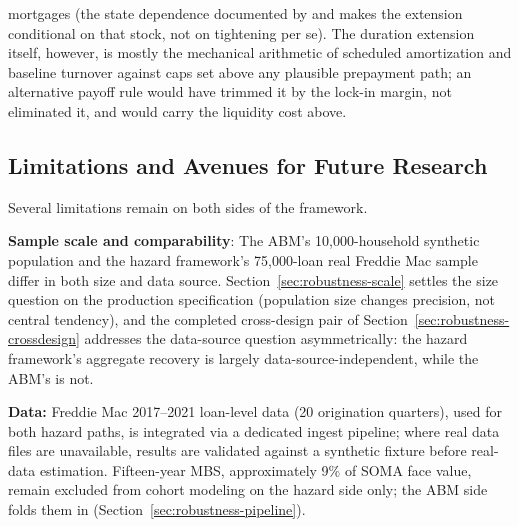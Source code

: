 \documentclass[12pt]{article}
\begin{document}
mortgages (the state dependence documented by \citet{berger2021} and \citet{eichenbaum2022} makes the extension conditional on that stock, not on tightening per se). The duration extension itself, however, is mostly the mechanical arithmetic of scheduled amortization and baseline turnover against caps set above any plausible prepayment path; an alternative payoff rule would have trimmed it by the lock-in margin, not eliminated it, and would carry the liquidity cost above.

\subsection{Limitations and Avenues for Future Research}\label{sec:limitations}

Several limitations remain on both sides of the framework.

\textbf{Sample scale and comparability}: The ABM's 10,000-household synthetic population and the hazard framework's 75,000-loan real Freddie Mac sample differ in both size and data source. Section~\ref{sec:robustness-scale} settles the size question on the production specification (population size changes precision, not central tendency), and the completed cross-design pair of Section~\ref{sec:robustness-crossdesign} addresses the data-source question asymmetrically: the hazard framework's aggregate recovery is largely data-source-independent, while the ABM's is not.

\textbf{Data:} Freddie Mac 2017--2021 loan-level data (20 origination quarters), used for both hazard paths, is integrated via a dedicated ingest pipeline; where real data files are unavailable, results are validated against a synthetic fixture before real-data estimation. Fifteen-year MBS, approximately 9\% of SOMA face value, remain excluded from cohort modeling on the hazard side only; the ABM side folds them in (Section~\ref{sec:robustness-pipeline}).
\end{document}

